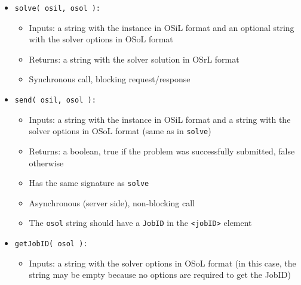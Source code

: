 \begin{itemize}

\item {\tt solve( osil, osol ):}

\begin{itemize}

\item Inputs: a string with the instance in OSiL format and an optional string with the solver options
in OSoL format

\item Returns: a string with the solver solution in OSrL format

\item Synchronous call, blocking request/response

\end{itemize}



\item {\tt send( osil, osol ):}

\begin{itemize}

\item Inputs: a string with the instance in OSiL format and a string with the solver options
in OSoL format (same as in {\tt solve})

\item Returns:  a boolean, true if the problem was successfully submitted, false otherwise

\item Has the same signature as {\tt solve}

\item Asynchronous (server side), non-blocking call

\item The {\tt osol} string should have a {\tt JobID} in the {\tt <jobID>} element
\end{itemize}


\item {\tt getJobID( osol ):}

\begin{itemize}

\item Inputs: a string  with the solver options in OSoL format (in this case, the string
may be empty because no options are required to get the JobID)


\end{itemize}
\end{itemize}
